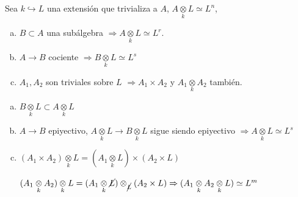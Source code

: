 \begin{teo}
    Sea $k \hookrightarrow L$ una extensi\'on que trivializa a $A$, $A \underset{k}{\otimes} L \simeq L^n$,
    \begin{enumerate}[a)]
        \item $B \subset A$ una sub\'algebra $\Rightarrow A\underset{k}{\otimes} L\simeq  L^r$.
        \item $A \longrightarrow B$ cociente $ \Rightarrow B \underset{k}{\otimes} L \simeq L^s$
        \item $A_1,A_2$ son triviales sobre $L$ $\Rightarrow A_1\times A_2$ y $A_1 \underset{k}{\otimes} A_2$ tambi\'en.
    \end{enumerate}
\end{teo}
\begin{dem}
    \begin{enumerate}[a)]
        \item $B\underset{k}{\otimes} L \subset A \underset{k}{\otimes} L$
        \item $A\longrightarrow B$ epiyectivo, $A\underset{k}{\otimes} L \longrightarrow B \underset{k}{\otimes} L $ sigue siendo epiyectivo $\Rightarrow A\underset{k}{\otimes} L \simeq L^s$
        \item $(A_1 \times A_2) \underset{k}{\otimes} L = (A_1 \underset{k}{\otimes} L )\times (A_2 \times L)$

        $(A_1 \underset{k}{\otimes} A_2) \underset{k}{\otimes} L = (A_1 \underset{k}{\otimes} \cancel{L} )\otimes_{\cancel{L}} (A_2 \times L) \Rightarrow (A_1 \underset{k}{\otimes} A_2 \underset{k}{\otimes} L) \simeq  L^m $
    \end{enumerate}
\end{dem}

